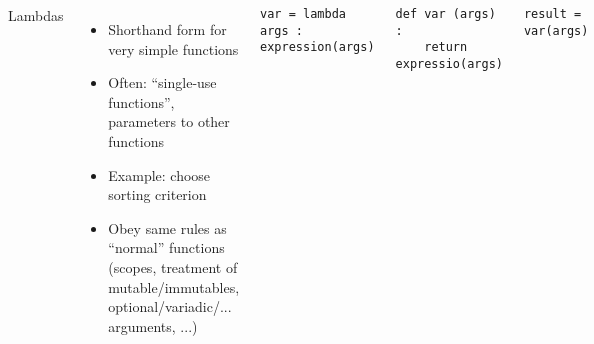 \begin{frame}[fragile]
\begin{tcolorbox}[title=Memory Model]
\begin{center}
\end{center}
\end{tcolorbox}
%
\end{frame}


\begin{frame}[fragile]
%
\begin{columns}[T]
\begin{Large}
	{Lambdas}
\end{Large}
\vspace{6pt}
\begin{itemize}
\item Shorthand form for very simple functions
\item Often: \enquote{single-use functions}, parameters to other functions
\item Example: choose sorting criterion
\item Obey same rules as \enquote{normal} functions (scopes, treatment of mutable/immutables, optional/variadic/... arguments, ...)
\end{itemize}
%
\begin{codebox}
\begin{verbatim}
var = lambda args : expression(args)
\end{verbatim}
\end{codebox}
%
\begin{codebox}
\begin{verbatim}
def var (args) :
    return expressio(args)
\end{verbatim}
\end{codebox}
%
\begin{codebox}
\begin{verbatim}
result = var(args)
\end{verbatim}
\end{codebox}
\end{columns}
%
\end{frame}

